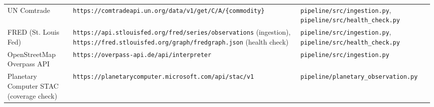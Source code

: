 {\begin{longtable}{>{\raggedright\arraybackslash}p{3.45cm}>{\raggedright\arraybackslash}p{5.17cm}>{\raggedright\arraybackslash}p{5.17cm}}
UN Comtrade & \texttt{https:/\allowbreak{}/\allowbreak{}comtradeapi.un.org/\allowbreak{}data/\allowbreak{}v1/\allowbreak{}get/\allowbreak{}C/\allowbreak{}A/\allowbreak{}\{commodity\}} & \texttt{pipeline/\allowbreak{}src/\allowbreak{}ingestion.py}, \texttt{pipeline/\allowbreak{}src/\allowbreak{}health\_check.py} \\
FRED (St. Louis Fed) & \texttt{https:/\allowbreak{}/\allowbreak{}api.stlouisfed.org/\allowbreak{}fred/\allowbreak{}series/\allowbreak{}observations} (ingestion), \texttt{https:/\allowbreak{}/\allowbreak{}fred.stlouisfed.org/\allowbreak{}graph/\allowbreak{}fredgraph.json} (health check) & \texttt{pipeline/\allowbreak{}src/\allowbreak{}ingestion.py}, \texttt{pipeline/\allowbreak{}src/\allowbreak{}health\_check.py} \\
OpenStreetMap Overpass API & \texttt{https:/\allowbreak{}/\allowbreak{}overpass-api.de/\allowbreak{}api/\allowbreak{}interpreter} & \texttt{pipeline/\allowbreak{}src/\allowbreak{}ingestion.py} \\
Planetary Computer STAC (coverage check) & \texttt{https:/\allowbreak{}/\allowbreak{}planetarycomputer.microsoft.com/\allowbreak{}api/\allowbreak{}stac/\allowbreak{}v1} & \texttt{pipeline/\allowbreak{}planetary\_observation.py} \\
\bottomrule
\end{longtable}
}
